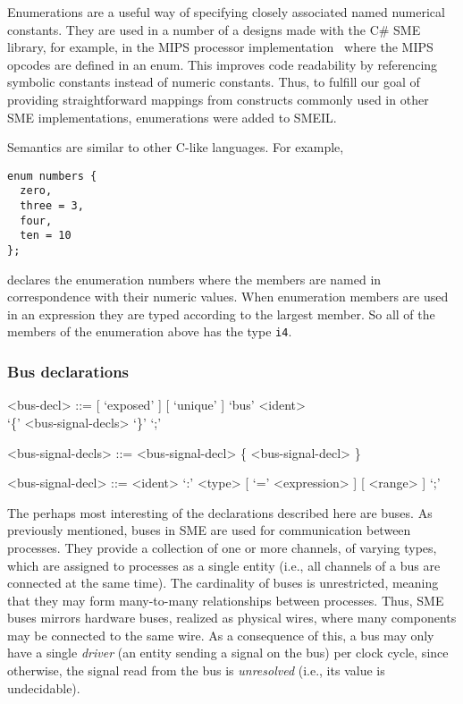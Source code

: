 Enumerations are a useful way of specifying closely associated named numerical
constants. They are used in a number of a designs made with the C\# SME library,
for example, in the MIPS processor implementation~\cite{johnsen2017thesis} where
the MIPS opcodes are defined in an {\ttfamily enum}. This improves code
readability by referencing symbolic constants instead of numeric
constants. Thus, to fulfill our goal of providing straightforward mappings from
constructs commonly used in other SME implementations, enumerations were added
to SMEIL.

Semantics are similar to other C-like languages. For example,
\begin{lstlisting}[language=smeil]
enum numbers {
  zero,
  three = 3,
  four,
  ten = 10
};
\end{lstlisting}
declares the enumeration {\ttfamily numbers} where the members are named in
correspondence with their numeric values. When enumeration members are used in
an expression they are typed according to the largest member. So all of the
members of the enumeration above has the type {\tt i4}.


\subsubsection{Bus declarations}

\begin{grammar}
<bus-decl> ::= [ `exposed' ] [ `unique' ] `bus' <ident> \\ `\{' <bus-signal-decls> `\}'  `;'

<bus-signal-decls> ::= <bus-signal-decl> \{ <bus-signal-decl> \}

<bus-signal-decl> ::= <ident> `:' <type> [ `=' <expression> ] [ <range> ] `;'
\end{grammar}

The perhaps most interesting of the declarations described here are buses. As
previously mentioned, buses in SME are used for communication between
processes. They provide a collection of one or more channels, of varying types,
which are assigned to processes as a single entity (i.e., all channels of a bus
are connected at the same time). The cardinality of buses is unrestricted,
meaning that they may form many-to-many relationships between processes. Thus,
SME buses mirrors hardware buses, realized as physical wires, where many
components may be connected to the same wire. As a consequence of this, a bus
may only have a single {\itshape driver} (an entity sending a signal on the bus)
per clock cycle, since otherwise, the signal read from the bus is {\itshape
  unresolved} (i.e., its value is undecidable).

